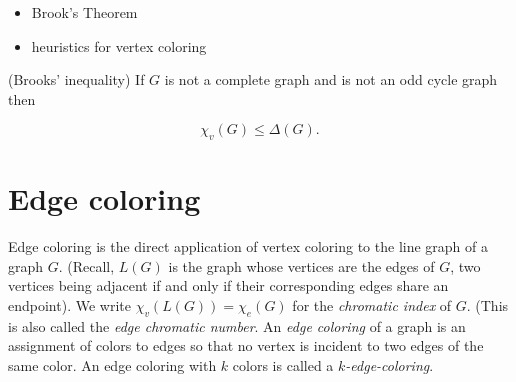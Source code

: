 \begin{itemize}
\item Brook's Theorem
\item heuristics for vertex coloring
\end{itemize}

\begin{theorem}  
(Brooks' inequality)
If $G$ is not a complete graph and is not an odd cycle graph then

\[
    \chi_v(G) \le \Delta(G). 
\]
\end{theorem}


\section{Edge coloring}

Edge coloring is the direct application of vertex coloring to the 
line graph of a graph $G$. (Recall, $L(G)$ is the graph whose 
vertices are the edges of $G$, two vertices being adjacent if and 
only if their corresponding edges share an endpoint). 
We write $\chi_v(L(G)) = \chi_e(G)$ for the {\it chromatic index} of $G$.
(This is also called the {\it edge chromatic number}.
An {\it edge coloring} of a graph is an assignment of colors to 
edges so that no vertex is
incident to two edges of the same color. An edge coloring with 
$k$ colors is called a {\it $k$-edge-coloring}. 

